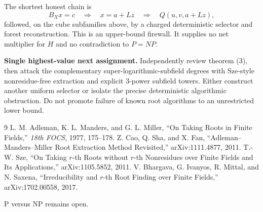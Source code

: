 \documentclass[11pt]{article}
\begin{document}
The shortest honest chain is
\[
 B_Xx=c\quad\Longrightarrow\quad x=a+Lz
 \quad\Longrightarrow\quad Q(u,v,a+Lz),
\]
followed, on the cube subfamilies above, by a charged deterministic selector
and forest reconstruction.  This is an upper-bound firewall.  It supplies no
net multiplier for $H$ and no contradiction to $P=NP$.

\textbf{Single highest-value next assignment.}
Independently review theorem (3), then attack the complementary
super-logarithmic-subfield degrees with Sze-style nonresidue-free extraction
and explicit $3$-power subfield towers.  Either construct another uniform
selector or isolate the precise deterministic algorithmic obstruction.  Do
not promote failure of known root algorithms to an unrestricted lower bound.

\begin{thebibliography}{9}
 L. M. Adleman, K. L. Manders, and G. L. Miller,
``On Taking Roots in Finite Fields,'' \emph{18th FOCS}, 1977, 175--178.
 Z. Cao, Q. Sha, and X. Fan,
``Adleman--Manders--Miller Root Extraction Method Revisited,''
arXiv:1111.4877, 2011.
 T.-W. Sze,
``On Taking $r$-th Roots without $r$-th Nonresidues over Finite Fields and
Its Applications,'' arXiv:1105.5852, 2011.
 V. Bhargava, G. Ivanyos, R. Mittal, and N. Saxena,
``Irreducibility and $r$-th Root Finding over Finite Fields,''
arXiv:1702.00558, 2017.
\end{thebibliography}

\bigskip
\noindent P versus NP remains open.
\end{document}
